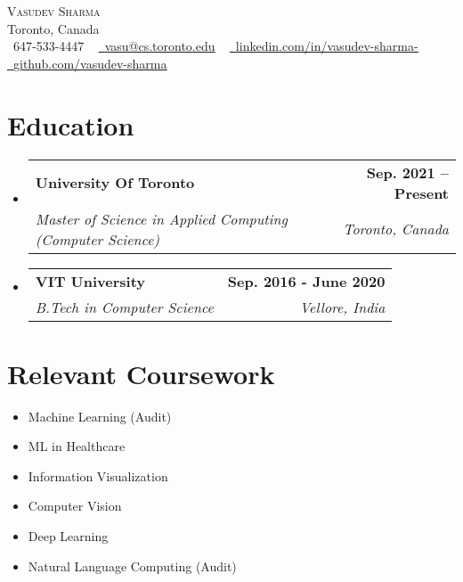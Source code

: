\documentclass[letterpaper,11pt]{article}
\makeatletter
\newcommand{\resumeSubheading}[4]{
  \vspace{-2pt}\item
    \begin{tabular*}{1.0\textwidth}[t]{l@{\extracolsep{\fill}}r}
      \textbf{#1} & \textbf{\small #2} \\
      \textit{\small#3} & \textit{\small #4} \\
    \end{tabular*}\vspace{-7pt}
}
\newcommand{\resumeSubHeadingListStart}{\begin{itemize}[leftmargin=0.0in, label={}]}
\newcommand{\resumeSubHeadingListEnd}{\end{itemize}}
\makeatother
\begin{document}
\begin{center}
    {\Huge \scshape Vasudev Sharma} \\ \vspace{1pt}
    Toronto, Canada \\ \vspace{1pt}
    \small \raisebox{-0.1\height}\faPhone\ 647-533-4447 ~ \href{mailto:vasu@cs.toronto.edu}{\raisebox{-0.2\height}\faEnvelope\  \underline{vasu@cs.toronto.edu}} ~ 
    \href{https://linkedin.com/in/vasudev-sharma-}{\raisebox{-0.2\height}\faLinkedin\ \underline{linkedin.com/in/vasudev-sharma-}}  ~
    \href{https://github.com/}{\raisebox{-0.2\height}\faGithub\ \underline{github.com/vasudev-sharma}}
    \vspace{-8pt}
\end{center}

\begin{comment}
    \section{Summary}
    An open source contributor with one 1-year experience as a Machine Learning Engineer
\end{comment}
\section{Education}
  \resumeSubHeadingListStart
    \resumeSubheading
      {University Of Toronto}{Sep. 2021 -- Present}
      {Master of Science in Applied Computing (Computer Science)}{Toronto, Canada}
    \resumeSubheading
        {VIT University}{Sep. 2016 - June 2020}
        {B.Tech in Computer Science}{Vellore, India}
  \resumeSubHeadingListEnd

\section{Relevant Coursework}
        \begin{multicols}{4}
            \begin{itemize}[itemsep=-10pt, parsep=15pt]
                \item\small Machine Learning (Audit)
                \item\small ML in Healthcare
                \item Information Visualization
                \item Computer Vision 
                \item Deep Learning
                \item \small Natural Language Computing (Audit)
            \end{itemize}
        \end{multicols}
        \vspace*{1.0\multicolsep}
\end{document}
